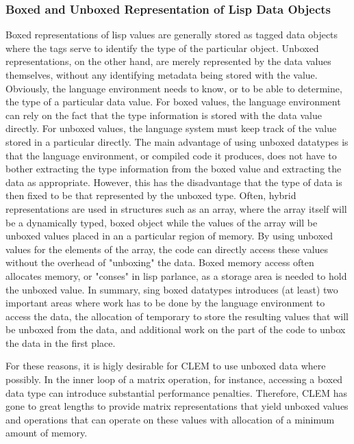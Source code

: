 \documentclass[10pt]{article}
\begin{document}
\baselineskip12pt
\subsubsection{Boxed and Unboxed Representation of Lisp Data Objects}
\baselineskip14pt
Boxed representations of lisp values are generally stored
 as tagged data objects where the tags serve to identify the type
 of the particular object. Unboxed representations, on the other
 hand, are merely represented by the data values themselves,
 without any identifying metadata being stored with the
 value. Obviously, the language environment needs to know, or to
 be able to determine, the type of a particular data value. For
 boxed values, the language environment can rely on the fact that
 the type information is stored with the data value directly. For
 unboxed values, the language system must keep track of the value
 stored in a particular directly. The main advantage of using
 unboxed datatypes is that the language environment, or compiled
 code it produces, does not have to bother extracting the type
 information from the boxed value and extracting the data as
 appropriate. However, this has the disadvantage that the type of
 data is then fixed to be that represented by the unboxed
 type. Often, hybrid representations are used in structures such
 as an array, where the array itself will be a dynamically typed,
 boxed object while the values of the array will be unboxed
 values placed in an a particular region of memory. By using
 unboxed values for the elements of the array, the code can
 directly access these values without the overhead of "unboxing"
 the data. Boxed memory access often allocates memory,
 or "conses" in lisp parlance, as a storage area is needed to
 hold the unboxed value. In summary, sing boxed datatypes introduces
 (at least) two important areas where work has to be done by the
 language environment to access the data, the allocation of temporary
 to store the resulting values that will be unboxed from the data, and
 additional work on the part of the code to unbox the data in the
 first place.

For these reasons, it is higly desirable for CLEM to use
 unboxed data where possibly. In the inner loop of a matrix
 operation, for instance, accessing a boxed data type can
 introduce substantial performance penalties. Therefore, CLEM has gone
 to great lengths to provide matrix representations that yield unboxed
 values and operations that can operate on these values with
 allocation of a minimum amount of memory.
\end{document}
